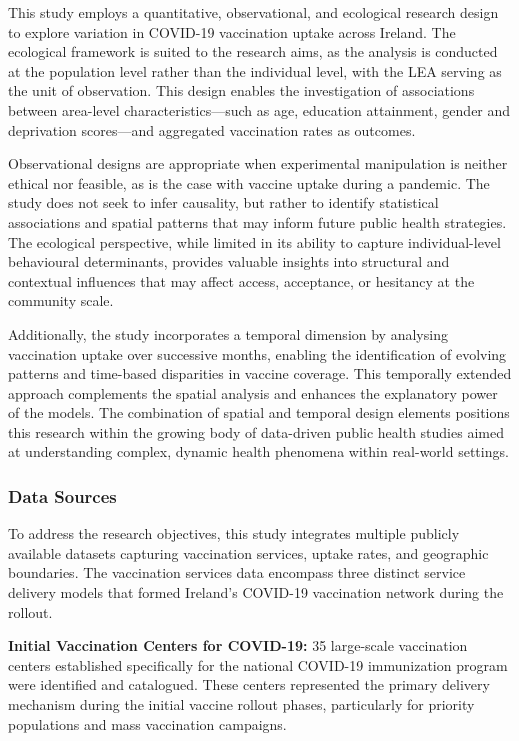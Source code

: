 \documentclass{article}
\begin{document}
This study employs a quantitative, observational, and ecological
research design to explore variation in COVID-19 vaccination uptake
across Ireland. The ecological framework is suited to the research aims,
as the analysis is conducted at the population level rather than the
individual level, with the LEA serving as the unit of observation. This
design enables the investigation of associations between area-level
characteristics---such as age, education attainment, gender and
deprivation scores---and aggregated vaccination rates as outcomes.

Observational designs are appropriate when experimental manipulation is
neither ethical nor feasible, as is the case with vaccine uptake during
a pandemic. The study does not seek to infer causality, but rather to
identify statistical associations and spatial patterns that may inform
future public health strategies. The ecological perspective, while
limited in its ability to capture individual-level behavioural
determinants, provides valuable insights into structural and contextual
influences that may affect access, acceptance, or hesitancy at the
community scale.

Additionally, the study incorporates a temporal dimension by analysing
vaccination uptake over successive months, enabling the identification
of evolving patterns and time-based disparities in vaccine coverage.
This temporally extended approach complements the spatial analysis and
enhances the explanatory power of the models. The combination of spatial
and temporal design elements positions this research within the growing
body of data-driven public health studies aimed at understanding
complex, dynamic health phenomena within real-world settings.

\subsubsection{Data Sources}\label{data-sources}

To address the research objectives, this study integrates multiple
publicly available datasets capturing vaccination services, uptake
rates, and geographic boundaries. The vaccination services data
encompass three distinct service delivery models that formed Ireland's
COVID-19 vaccination network during the rollout.

\textbf{Initial Vaccination Centers for COVID-19:} 35 large-scale
vaccination centers established specifically for the national COVID-19
immunization program were identified and catalogued. These centers
represented the primary delivery mechanism during the initial vaccine
rollout phases, particularly for priority populations and mass
vaccination campaigns.
\end{document}
